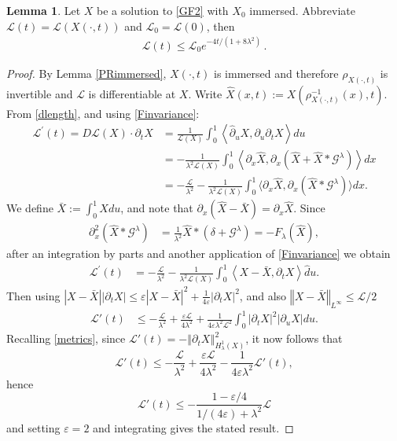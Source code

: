 \documentclass[a4paper,11pt]{amsart}
\theoremstyle{definition}\newtheorem*{definition}{Definition}
\theoremstyle{definition} \newtheorem{proposition}[theorem]{Proposition}
\theoremstyle{definition}\newtheorem{lemma}[theorem]{Lemma}
\theoremstyle{definition}\newtheorem{corollary}[theorem]{Corollary}
\theoremstyle{definition}\newtheorem{example}{Example}
\theoremstyle{remark}\newtheorem*{remark}{Remark}
\newcommand{\norm}[1]{{\left \Vert {#1}\right \Vert}}
\newcommand{\abs}[1]{\left | {#1}\right |}
\def\length{\mathcal L}
\begin{document}
\begin{lemma} \label{lengthdecay}
Let $X$ be a solution to \eqref{GF2} with $X_0$ immersed. Abbreviate $\mathcal L (t)=\mathcal L(X(\cdot,t))$ and $\mathcal L_0=\mathcal L(0)$, then
\begin{align}\label{eq:ldecay}
\length(t)\leq \length_0 e^{-4t/(1+8\lambda^2)}
\,.
\end{align}
\end{lemma}
\begin{proof} By Lemma \ref{PRimmersed}, $X(\cdot,t)$ is immersed and therefore $\rho_{X(\cdot,t)}$ is invertible and $\length$ is differentiable at $X$.
Write $\hat X(x,t):=X(\rho_{X(\cdot,t)}^{-1}(x),t)$.
From \eqref{dlength}, and using \eqref{Finvariance}:
\[
\begin{aligned}
\mathcal{L}^{\prime}(t)  =D \mathcal{L}(X) \cdot \partial_t X
&=\frac{1}{\length(X)}\int_0^1\left\langle\hat{\partial}_u X, \partial_u \partial_t X\right\rangle du\\
& =-\frac{1}{\lambda^2\length(X)} \int_0^{1}\left\langle\partial_x \hat X, \partial_x \left(\hat X+\hat X * \mathcal G^\lambda \right)\right\rangle dx \\
& =-\frac{\mathcal{L}}{\lambda^2}-\frac{1}{\lambda^2\length(X)} \int_0^{1} \langle \partial_x \hat X,\partial_x (\hat{X}\ast \mathcal G^\lambda)\rangle dx .
\end{aligned}
\]
We define $\bar{X}:=\int_0^1 X du$, and note that ${\partial}_x(\hat X-\bar{X})=\partial_x \hat X$. Since
\[
\begin{aligned}
\partial_x^2(\hat X \ast \mathcal G^\lambda) & =\frac{1}{\lambda^2} \hat X\ast (\delta+\mathcal G^\lambda)  =- F_\lambda(\hat X),
\end{aligned}
\]
after an integration by parts and another application of \eqref{Finvariance} we obtain
\[
\begin{aligned}
\mathcal{L}^{\prime}(t) 
& =-\frac{\mathcal{L}}{\lambda^2}-\frac{1}{\lambda^2\length(X)} \int_0^1\left\langle X-\bar{X}, \partial_t X\right\rangle \hat{d}u .
\end{aligned}
\]
Then using $\abs{X-\bar X}\abs{\partial_tX}\leq \varepsilon\abs{X-\bar X}^2+\frac{1}{4\varepsilon}\abs{\partial_tX}^2$, and also    $\norm{X-\bar X}_{L^\infty}\leq \length/2$
\begin{align*}
\length'(t)
& \leq -\frac{\length}{\lambda^{2}}+\frac{\varepsilon \length }{4\lambda^{2}}+ \frac{1}{4\varepsilon \lambda^2\length^2}\int_0^1 \abs{\partial_t X}^2 \abs{\partial_u X} du.
\end{align*}
Recalling \eqref{metrics}, since $\length'(t)=-\norm{\partial_t X}_{H^1_\lambda (X)}^2$, it now follows that 
\[
\length'(t)
 \leq -\frac{\length}{\lambda^{2}}+\frac{\varepsilon \length }{4\lambda^{2}}- \frac{1}{4\varepsilon \lambda^2}\length'(t),
\]
hence
\[
\length'(t)\leq -\frac{1-\varepsilon/4}{1/(4\varepsilon)+\lambda^2}\length \]
and setting $\varepsilon=2$ and integrating gives the stated result.  
\end{proof}
\end{document}
